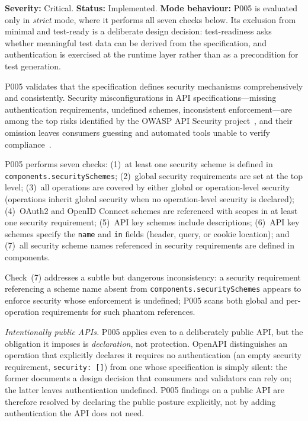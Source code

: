 \textbf{Severity:} Critical. \textbf{Status:} Implemented. \textbf{Mode behaviour:} P005 is evaluated only in \textit{strict} mode, where it performs all seven checks below. Its exclusion from minimal and test-ready is a deliberate design decision: test-readiness asks whether meaningful test data can be derived from the specification, and authentication is exercised at the runtime layer rather than as a precondition for test generation.

P005 validates that the specification defines security mechanisms comprehensively and consistently. Security misconfigurations in API specifications---missing authentication requirements, undefined schemes, inconsistent enforcement---are among the top risks identified by the OWASP API Security project~\cite{owasp-api-security}, and their omission leaves consumers guessing and automated tools unable to verify compliance~\cite{api-security-testing}.

P005 performs seven checks: (1)~at least one security scheme is defined in \texttt{components.securitySchemes}; (2)~global security requirements are set at the top level; (3)~all operations are covered by either global or operation-level security (operations inherit global security when no operation-level security is declared); (4)~OAuth2 and OpenID Connect schemes are referenced with scopes in at least one security requirement; (5)~API key schemes include descriptions; (6)~API key schemes specify the \texttt{name} and \texttt{in} fields (header, query, or cookie location); and (7)~all security scheme names referenced in security requirements are defined in components.

Check~(7) addresses a subtle but dangerous inconsistency: a security requirement referencing a scheme name absent from \texttt{components.\allowbreak securitySchemes} appears to enforce security whose enforcement is undefined; P005 scans both global and per-operation requirements for such phantom references.

\textit{Intentionally public APIs.} P005 applies even to a deliberately public API, but the obligation it imposes is \emph{declaration}, not protection. OpenAPI distinguishes an operation that explicitly declares it requires no authentication (an empty security requirement, \texttt{security: []}) from one whose specification is simply silent: the former documents a design decision that consumers and validators can rely on; the latter leaves authentication undefined. P005 findings on a public API are therefore resolved by declaring the public posture explicitly, not by adding authentication the API does not need.

